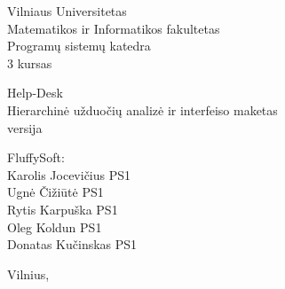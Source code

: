 \begin{titlepage}
    \begin{center}

        {\large
            Vilniaus Universitetas \\
            Matematikos ir Informatikos fakultetas \\
            Programų sistemų katedra \\
            3 kursas
        }

        \vspace{\fill}

        {\huge
            Help-Desk
        } \\[0.5cm]
        {\large
            Hierarchinė užduočių analizė ir interfeiso maketas \\
            \versionString{} versija
        }

        \vspace{3cm}

        \begin{flushright}
            \begin{minipage}{0.4\textwidth}
                FluffySoft: \\
                Karolis Jocevičius PS1\\
                Ugnė Čižiūtė PS1\\
                Rytis Karpuška PS1\\
                Oleg Koldun PS1\\
                Donatas Kučinskas PS1
            \end{minipage}
        \end{flushright}

        \vspace{\fill}

        {\large Vilnius, \the\year}

    \end{center}
\end{titlepage}
